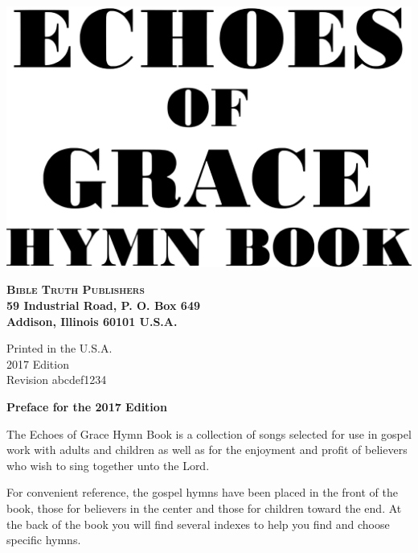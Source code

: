 \documentclass{book}
\begin{document}

\vspace*{1in}

\noindent\hfil\includegraphics[scale=0.06]{booklayout/bodoni-scan.pdf}\hfil

\vfill

\begin{center}
\textbf{
\large\textsc{Bible Truth Publishers}\\
\small{59 Industrial Road, P. O. Box 649\\
Addison, Illinois 60101 U.S.A.\\
}
}
\end{center}

\pagebreak

\vspace*{\fill}
\begin{center}
Printed in the U.S.A.\\
2017 Edition\\
Revision abcdef1234
\end{center}

\pagebreak


\vspace*{1in}
\noindent\hfil{\textbf{Preface for the 2017 Edition}}\hfil

The {\textit{}Echoes of Grace Hymn Book} is a collection of songs selected for
use in gospel work with adults and children as well as for the enjoyment and
profit of believers who wish to sing together unto the Lord.

For convenient reference, the gospel hymns have been placed in the front of the
book, those for believers in the center and those for children toward the end.
At the back of the book you will find several indexes to help you find and
choose specific hymns.
\end{document}
